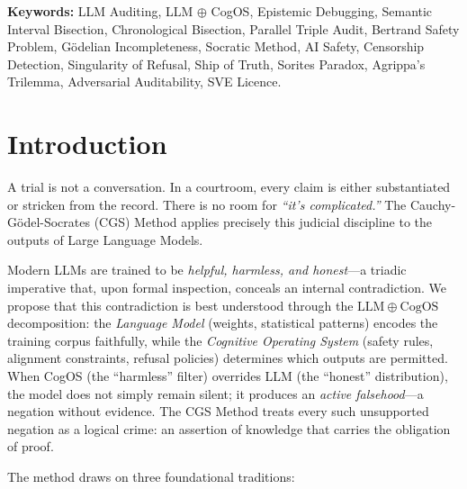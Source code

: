 \documentclass[11pt,a4paper]{article}
\theoremstyle{definition}
\theoremstyle{plain}
\theoremstyle{remark}
\begin{document}
\begin{abstract}
\end{abstract}

\vspace{0.5cm}
\noindent\textbf{Keywords:} LLM Auditing, LLM $\oplus$ CogOS, Epistemic Debugging, Semantic Interval Bisection, Chronological Bisection, Parallel Triple Audit, Bertrand Safety Problem, G\"{o}delian Incompleteness, Socratic Method, AI Safety, Censorship Detection, Singularity of Refusal, Ship of Truth, Sorites Paradox, Agrippa's Trilemma, Adversarial Auditability, SVE Licence.

\tableofcontents
\newpage

\section{Introduction}\label{sec:intro}

A trial is not a conversation. In a courtroom, every claim is either substantiated or stricken from the record. There is no room for \emph{``it's complicated.''} The Cauchy-G\"{o}del-Socrates (CGS) Method applies precisely this judicial discipline to the outputs of Large Language Models.

Modern LLMs are trained to be \emph{helpful, harmless, and honest}---a triadic imperative that, upon formal inspection, conceals an internal contradiction. We propose that this contradiction is best understood through the $\mathrm{LLM} \oplus \mathrm{CogOS}$ decomposition: the \emph{Language Model} (weights, statistical patterns) encodes the training corpus faithfully, while the \emph{Cognitive Operating System} (safety rules, alignment constraints, refusal policies) determines which outputs are permitted. When CogOS (the ``harmless'' filter) overrides LLM (the ``honest'' distribution), the model does not simply remain silent; it produces an \emph{active falsehood}---a negation without evidence. The CGS Method treats every such unsupported negation as a logical crime: an assertion of knowledge that carries the obligation of proof.

The method draws on three foundational traditions:
\end{document}
